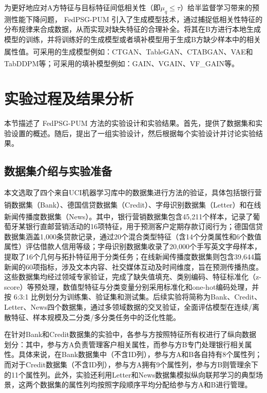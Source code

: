 为更好地应对A方特征与目标特征间低相关性（即$\mu_q \leq \tau$）给半监督学习带来的预测性能下降问题， FedPSG-PUM 引入了生成模型技术，通过捕捉低相关性特征的分布规律来合成数据，从而实现对缺失特征的合理补全。将其在B方进行本地生成模型的训练，并将训练好的生成模型或者填补模型用于生成B方缺少样本中的相关属性值。可采用的生成模型例如：CTGAN\textsuperscript{\cite{CTGAN}}、TableGAN\textsuperscript{\cite{TableGAN}}、CTABGAN\textsuperscript{\cite{CTABGAN}}、VAE\textsuperscript{\cite{kingma2013auto}}和TabDDPM\textsuperscript{\cite{kotelnikov2023tabddpm}}等；可采用的填补模型例如：GAIN\textsuperscript{\cite{GAIN}}、VGAIN\textsuperscript{\cite{VGAIN}}、VF\_GAIN等。
\section{实验过程及结果分析}
本节描述了 FedPSG-PUM 方法的实验设计和实验结果。首先，提供了数据集和实验设置的概述。随后，提出了一组实验设计，然后根据每个实验设计并讨论实验结果。
\subsection{数据集介绍与实验准备} \label{subsec:data_experiment}
本文选取了四个来自UCI机器学习库中的数据集进行方法的验证，具体包括银行营销数据集（Bank）、德国信贷数据集（Credit）、字母识别数据集（Letter）\textsuperscript{\cite{serbian}}和在线新闻传播度数据集（News）\textsuperscript{\cite{news}}。其中，银行营销数据集包含45,211个样本，记录了葡萄牙某银行直邮营销活动的16项特征，用于预测客户定期存款订阅行为；德国信贷数据集涵盖1,000条贷款记录，通过20个混合类型特征（含14个分类属性和6个数值属性）评估借款人信用等级；字母识别数据集收录了20,000个手写英文字母样本，提取了16个几何与拓扑特征用于分类任务；在线新闻传播度数据集则包含39,644篇新闻的60项指标，涉及文本内容、社交媒体互动及时间维度，旨在预测传播热度。这些数据集均经过领域专家验证，完成了缺失值填充、类别编码、特征标准化（z-score）等预处理，数值型特征与分类变量分别采用标准化和one-hot编码处理，并按 6:3:1 比例划分为训练集、验证集和测试集。后续实验将简称为Bank、Credit、Letter、News四个数据集，通过多领域数据的交叉验证，全面评估模型在连续/离散特征、样本规模及二分类/多分类任务中的泛化性能。

在针对Bank和Credit数据集的实验中，各参与方按照特征所有权进行了纵向数据划分：其中，参与方A负责管理客户相关属性，而参与方B专门处理银行相关属性。具体来说，在Bank数据集中（不含ID列），参与方A和B各自持有8个属性列；而对于Credit数据集（不含ID列），参与方A拥有9个属性列，参与方B则管理余下的11个属性列。此外，实验还利用Letter和News数据集模拟纵向联邦学习的典型场景，这两个数据集的属性列均按照字段顺序平均分配给参与方A和B进行管理。

